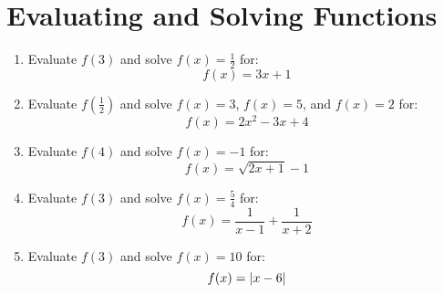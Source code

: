 \documentclass[letterpaper,12pt,fleqn]{article}
\begin{document}
\section*{Evaluating and Solving Functions}

\bigskip

\begin{enumerate}[left=0in]
\item Evaluate \(f(3)\) and solve \(f(x)=\frac{1}{2}\) for:
  \[f(x)=3x+1\]

  \vspace{2in}

\item Evaluate \(f(\frac{1}{2})\) and solve \(f(x)=3\), \(f(x)=5\), and \(f(x)=2\) for:
  \[f(x)=2x^2-3x+4\]

  \newpage

\item Evaluate \(f(4)\) and solve \(f(x)=-1\) for:
  \[f(x)=\sqrt{2x+1}-1\]

  \newpage

\item Evaluate \(f(3)\) and solve \(f(x)=\frac{5}{4}\) for:
  \[f(x)=\frac{1}{x-1}+\frac{1}{x+2}\]

  \newpage

\item Evaluate \(f(3)\) and solve \(f(x)=10\) for:
  \[f(x)=\lvert x-6\rvert\]
\end{enumerate}
\end{document}
